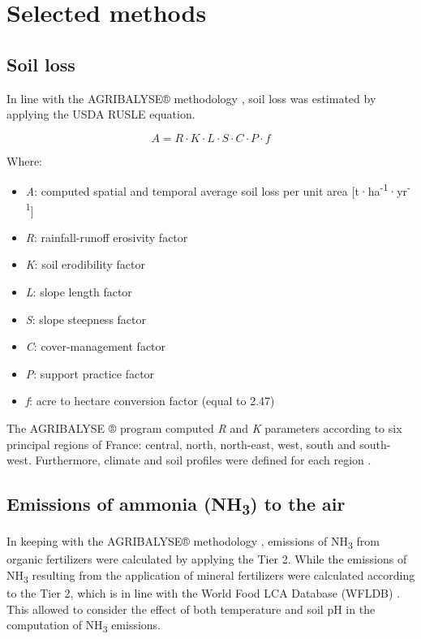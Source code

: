 \documentclass[openany]{book}
\begin{document}
\hypertarget{selected-methods}{%
\chapter{Selected methods}\label{selected-methods}}

\hypertarget{soil-loss}{%
\section{Soil loss}\label{soil-loss}}

In line with the AGRIBALYSE® methodology \citep{Koch2015}, soil loss was estimated by applying the USDA RUSLE equation.

\[A = R\cdot K \cdot L \cdot S \cdot C \cdot P \cdot f\]

Where:

\begin{itemize}
\item
  \emph{A}: computed spatial and temporal average soil loss per unit area {[}t·ha\textsuperscript{-1}·yr\textsuperscript{-1}{]}
\item
  \emph{R}: rainfall-runoff erosivity factor
\item
  \emph{K}: soil erodibility factor
\item
  \emph{L}: slope length factor
\item
  \emph{S}: slope steepness factor
\item
  \emph{C}: cover-management factor
\item
  \emph{P}: support practice factor
\item
  \emph{f}: acre to hectare conversion factor (equal to 2.47)
\end{itemize}

The AGRIBALYSE ® program computed \emph{R} and \emph{K} parameters according to six principal regions of France: central, north, north-east, west, south and south-west. Furthermore, climate and soil profiles were defined for each region \citep{Koch2015}.

\hypertarget{emissions-of-ammonia-nh3-to-the-air}{%
\section{\texorpdfstring{Emissions of ammonia (NH\textsubscript{3}) to the air}{Emissions of ammonia (NH3) to the air}}\label{emissions-of-ammonia-nh3-to-the-air}}

In keeping with the AGRIBALYSE® methodology \citep{Koch2015}, emissions of NH\textsubscript{3} from organic fertilizers were calculated by applying the \citet{emep-eea2009} Tier 2. While the emissions of NH\textsubscript{3} resulting from the application of mineral fertilizers were calculated according to the \citet{emep-eea2013} Tier 2, which is in line with the World Food LCA Database (WFLDB) \citep{nemecek2014}. This allowed to consider the effect of both temperature and soil pH in the computation of NH\textsubscript{3} emissions.
\end{document}
